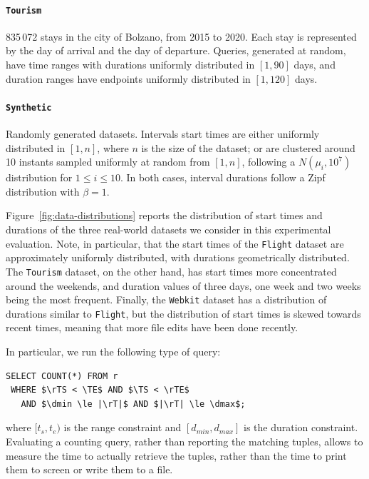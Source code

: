 \documentclass[sigconf,nonacm,anonymous]{acmart}
\theoremstyle{definition}
\newcommand{\TS}{\ensuremath{t_s}}
\newcommand{\TE}{\ensuremath{t_e}}
\newcommand{\rTE}{\ensuremath{r.T_e}}
\newcommand{\rTS}{\ensuremath{r.T_s}}
\newcommand{\dmin}{\ensuremath{d_{min}}}
\newcommand{\dmax}{\ensuremath{d_{max}}}
\newcommand{\rT}{\ensuremath{r.T}}
\newcommand{\dataset}[1]{\texttt{#1}}
\begin{document}
\paragraph{\dataset{Tourism}} 835\,072 stays in the city of Bolzano, from 2015 to 2020.
Each stay is represented by the day of arrival and the day of departure.
Queries, generated at random, have time ranges with durations uniformly distributed in $[1, 90]$ days,
and duration ranges have endpoints uniformly distributed in $[1, 120]$ days.
%
\paragraph{\dataset{Synthetic}} Randomly generated datasets.
Intervals start times are either uniformly distributed in $[1, n]$, where $n$ is the size of the dataset;
or are clustered around 10 instants sampled uniformly at random from $[1, n]$, following a $N(\mu_i, 10^7)$
distribution for $1 \le i \le 10$.
In both cases, interval durations follow a Zipf distribution with $\beta=1$.

\begin{table}
  \caption{Performance attained by the tested indices on different workloads, in terms of queries per second.
		The smaller number in parentheses report the time to build the index, in milliseconds.
		\label{tbl:overview-qps}}
  {
    \small
    
  }
\end{table}


Figure~\ref{fig:data-distributions} reports the distribution of start
times and durations of the three real-world datasets we consider in
this experimental evaluation. Note, in particular, that the start
times of the \dataset{Flight} dataset are approximately uniformly
distributed, with durations geometrically distributed.  The
\dataset{Tourism} dataset, on the other hand, has start times more
concentrated around the weekends, and duration values of three days,
one week and two weeks being the most frequent.  Finally, the
\dataset{Webkit} dataset has a distribution of durations similar to
\dataset{Flight}, but the distribution of start times is skewed
towards recent times, meaning that more file edits have been done
recently.

In particular, we run the following type of query:
\begin{lstlisting}[basicstyle=\ttfamily, mathescape=true]
SELECT COUNT(*) FROM r
 WHERE $\rTS < \TE$ AND $\TS < \rTE$
   AND $\dmin \le |\rT|$ AND $|\rT| \le \dmax$;
\end{lstlisting}
where $[\TS, \TE)$ is the range constraint and
$[\dmin, \dmax]$ is the duration constraint.
Evaluating a counting query, rather than reporting the matching tuples, allows to measure
the time to actually retrieve the tuples, rather than the time to print them to screen or
write them to a file.
\end{document}

